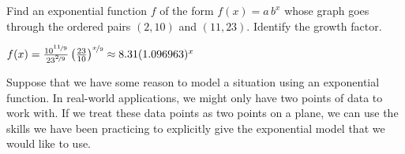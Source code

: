 \begin{doyouunderstand}
	\begin{problem}
	Find an exponential function $f$ of the form $f(x)=a\,b^x$ whose graph goes through the ordered pairs $(2,10)$ and $(11,23)$. 
	Identify the growth factor.
	\begin{shortsolution}	
		$f(x)=\frac{10^{\nicefrac{11}{9}}}{23^{\nicefrac{2}{9}}}\left(\frac{23}{10}\right)^{\nicefrac{x}{9}}\approx 8.31 (1.096963)^x$
	\end{shortsolution}
	\end{problem}
\end{doyouunderstand}
			
Suppose that we have some reason to model a situation using an exponential function.  In real-world applications, we 
might only have two points of data to work with.  If we treat these data points as two points on a plane, we can 
use the skills we have been practicing to explicitly give the exponential model that we would like to use.

